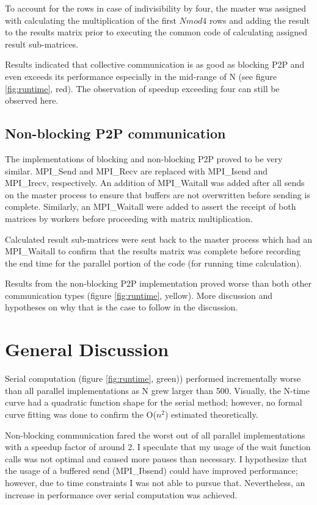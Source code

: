 \documentclass[12pt]{report}
\begin{document}
To account for the rows in case of indivisibility by four, the master was assigned with calculating the multiplication of the first $Nmod4$ rows and adding the result to the results matrix prior to executing the common code of calculating assigned result sub-matrices. 

Results indicated that collective communication is as good as blocking P2P and even exceeds its performance especially in the mid-range of N (see figure \ref{fig:runtime}, red). The observation of speedup exceeding four can still be observed here. 

\section{Non-blocking P2P communication}
The implementations of blocking and non-blocking P2P proved to be very similar. MPI\_Send and MPI\_Recv are replaced with MPI\_Isend and MPI\_Irecv, respectively. An addition of MPI\_Waitall was added after all sends on the master process to ensure that buffers are not overwritten before sending is complete. Similarly, an MPI\_Waitall were added to assert the receipt of both matrices by workers before proceeding with matrix multiplication.

Calculated result sub-matrices were sent back to the master process which had an MPI\_Waitall to confirm that the results matrix was complete before recording the end time for the parallel portion of the code (for running time calculation).

Results from the non-blocking P2P implementation proved worse than both other communication types (figure \ref{fig:runtime}, yellow). More discussion and hypotheses on why that is the case to follow in the discussion.


\chapter{General Discussion}
Serial computation (figure \ref{fig:runtime}, green)) performed incrementally worse than all parallel implementations as N grew larger than 500. Visually, the N-time curve had a quadratic function shape for the serial method; however, no formal curve fitting was done to confirm the O($n^2$) estimated theoretically.

Non-blocking communication fared the worst out of all parallel implementations with a speedup factor of around 2. I speculate that my usage of the wait function calls was not optimal and caused more pauses than necessary. I hypothesize that the usage of a buffered send (MPI\_Ibsend) could have improved performance; however, due to time constraints I was not able to pursue that. Nevertheless, an increase in performance over serial computation was achieved.
\end{document}
